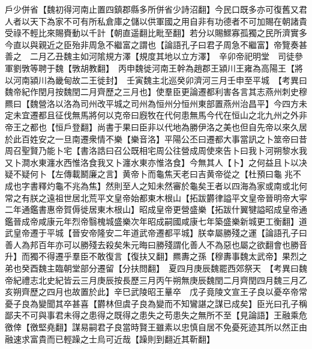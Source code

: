 戶少併省【魏初得河南止置四鎮郡縣多所併省少詩沼翻】今民口既多亦可復舊又君人者以天下為家不可有所私倉庫之儲以供軍國之用自非有功德者不可加賜在朝諸貴受祿不輕比來賜賚動以千計【朝直遥翻比毗至翻】若分以賜鰥寡孤獨之民所濟實多今直以與親近之臣殆非周急不繼富之謂也【論語孔子曰君子周急不繼富】帝覽奏甚善之　二月乙丑魏主如河隂規方澤【規度其地以立方澤】　辛卯帝祀明堂　司徒參軍劉斆等聘于魏【斆胡教翻】　丙申魏徙河南王幹為趙郡王潁川王雍為高陽王【將以河南潁川為畿甸故二王徙封】　壬寅魏主北巡癸卯濟河三月壬申至平城　【考異曰魏帝紀作閏月按魏閏二月齊歷之三月也】使羣臣更論遷都利害各言其志燕州刺史穆羆曰【魏營洛以洛為司州改平城之司州為恒州分恒州東部置燕州治昌平】今四方未定未宜遷都且征伐無馬將何以克帝曰廐牧在代何患無馬今代在恒山之北九州之外非帝王之都也【恒戶登翻】尚書于果曰臣非以代地為勝伊洛之美也但自先帝以來久居於此百姓安之一旦南遷衆情不樂【樂音洛】平陽公丕曰遷都大事當訊之卜筮帝曰昔周召聖賢乃能卜宅【書洛誥曰召公既相宅周公往營成周使來告卜曰我卜河朔黎水我又卜澗水東瀍水西惟洛食我又卜瀍水東亦惟洛食】今無其人【卜】之何益且卜以决疑不疑何卜【左傳載鬭廉之言】黄帝卜而龜焦天老曰吉黄帝從之【杜預曰龜兆不成也字書釋灼龜不兆為焦】然則至人之知未然審於龜矣王者以四海為家或南或北何常之有朕之遠祖世居北荒平文皇帝始都東木根山【拓跋欝律謚平文皇帝晉明帝大寜二年通鑑書惠帝賀傉徙居東木根山】昭成皇帝更營盛樂【拓跋什翼犍謚昭成皇帝通鑑晉成帝咸康元年烈帝翳槐城盛樂次年昭成嗣國咸康七年築盛樂新城更工衡翻】道武皇帝遷于平城【晉安帝隆安二年道武帝遷都平城】朕幸屬勝殘之運【論語孔子曰善人為邦百年亦可以勝殘去殺矣朱元晦曰勝殘謂化善人不為惡也屬之欲翻會也勝音升】而獨不得遷乎羣臣不敢復言【復扶又翻】羆夀之孫【穆夀事魏太武帝】果烈之弟也癸酉魏主臨朝堂部分遷留【分扶問翻】　夏四月庚辰魏罷西郊祭天　【考異曰魏帝紀禮志北史紀皆云三月庚辰按長歷三月丙午朔無庚辰魏閏二月齊閏四月魏三月乙亥朔齊歷之四月也故置於此】辛巳武陵昭王曅卒　戊子竟陵文宣王子良以憂卒帝常憂子良為變聞其卒甚喜【欝林但虞子良為變而不知鸞諶之謀已成矣】臣光曰孔子稱鄙夫不可與事君未得之患得之既得之患失之苟患失之無所不至【見論語】王融乘危徼倖【徼堅堯翻】謀易嗣君子良當時賢王雖素以忠慎自居不免憂死迹其所以然正由融速求富貴而已輕躁之士烏可近哉【躁則到翻近其靳翻】

